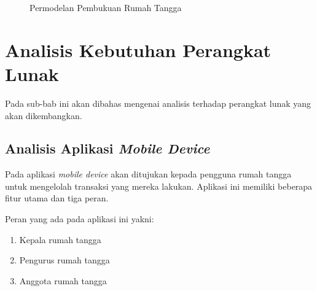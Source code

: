 \begin{figure}[h]
\centering
{}
\caption[Permodelan Pembukuan Rumah Tangga]{Permodelan Pembukuan Rumah Tangga} 
\label{fig:prt_architecture}
\end{figure}

\section{Analisis Kebutuhan Perangkat Lunak}

\hspace{0,5cm}Pada sub-bab ini akan dibahas mengenai analisis terhadap perangkat lunak yang akan dikembangkan.

\subsection{Analisis Aplikasi \textit{Mobile Device}}

Pada aplikasi \textit{mobile device} akan ditujukan kepada pengguna rumah tangga untuk mengelolah transaksi yang mereka lakukan. Aplikasi ini memiliki beberapa fitur utama dan tiga peran.

\hspace{0,5cm}Peran yang ada pada aplikasi ini yakni:
\begin{enumerate}
	\item Kepala rumah tangga
	\item	Pengurus rumah tangga
	\item Anggota rumah tangga
\end{enumerate}

